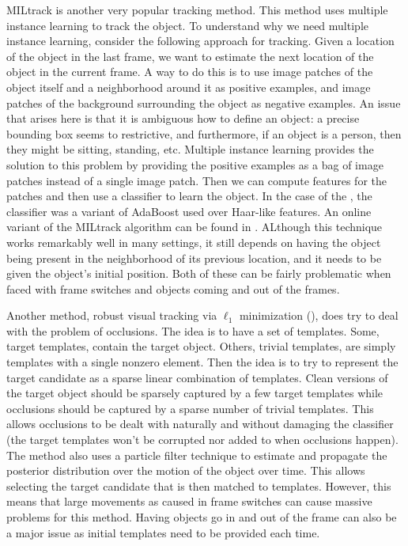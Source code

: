 \documentclass{article}
\begin{document}
MILtrack \cite{miltrack} is another very popular tracking method. This
method uses multiple instance learning to track the object. To understand
why we need multiple instance learning, consider the following approach for tracking.
Given a location of the object in the last frame, we want to estimate the next location
of the object in the current frame. A way to do this is to use image patches of the object
itself and a neighborhood around it as positive examples, and image patches of
the background surrounding the object as negative examples. An issue that arises
here is that it is ambiguous how to define an object: a precise bounding box seems
to restrictive, and furthermore, if an object is a person, then they might be sitting,
standing, etc. Multiple instance learning provides the solution to this problem
by providing the positive examples as a bag of image patches instead of a
single image patch. Then we can compute features for the patches and then
use a classifier to learn the object. In the case of the \cite{miltrack},
the classifier was a variant of AdaBoost used over Haar-like features. An online
variant of the MILtrack algorithm can be found in \cite{miltrackonline}. ALthough this technique
works remarkably well in many settings, it still depends on having the object being present in the neighborhood of its previous location, and it needs
to be given the object's initial position. Both of these can be fairly problematic when faced with frame switches and objects coming and out of the frames.

Another method, robust visual tracking via $\ell_1$ minimization (\cite{L1}), does try to deal with the problem of occlusions. The idea is to have a set of templates. Some, target templates, contain the target
object. Others, trivial templates, are simply templates with a single nonzero element. Then the idea is to try to represent the target candidate as a sparse linear combination of templates. Clean versions of the
target object should be sparsely captured by a few target templates while occlusions should be captured by a sparse number of trivial templates. This allows occlusions to be dealt with naturally and without
damaging the classifier (the target templates won't be corrupted nor added to when occlusions happen). The method also uses a particle filter technique to estimate and propagate the posterior distribution
over the motion of the object over time. This allows selecting the target candidate that is then matched to templates. However, this means that large movements as caused in frame switches can cause massive
problems for this method. Having objects go in and out of the frame can also be a major issue as initial templates need to be provided each time.
\end{document}
